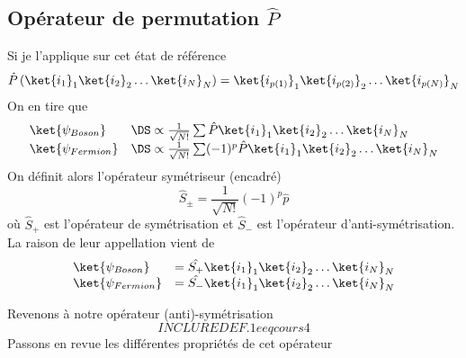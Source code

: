 \subsection{Opérateur de permutation $\hat P$}
Si je l'applique sur cet état de référence
\begin{equation}
\hat{P}\left(\ket{i_1}_1\ket{i_2}_2\dots\ket{i_N}_N\right) = \ket{i_{p(1)}}_1\ket{i_{p(2)}}_2\dots\ket{i_{p(N)}}_N
\end{equation}
On en tire que
\begin{equation}
\begin{array}{ll}
\ket{\psi_{Boson}} &\DS\propto \frac{1}{\sqrt{N!}}\sum \hat{P}\ket{i_1}_1\ket{i_2}_2\dots\ket{i_N}_N\\
\ket{\psi_{Fermion}} &\DS\propto \frac{1}{\sqrt{N!}}\sum(-1)^p \hat{P}\ket{i_1}_1\ket{i_2}_2\dots\ket{i_N}_N
\end{array}
\end{equation}
On définit alors l'opérateur symétriseur (encadré)
\begin{equation}
\hat{S}_\pm = \frac{1}{\sqrt{N!}}(-1)^p \hat{p}
\end{equation}
où $\hat{S}_+$ est l'opérateur de symétrisation et $\hat{S}_-$ est l'opérateur d'anti-symétrisation. La raison de leur 
appellation vient de
\begin{equation}
\begin{array}{ll}
\ket{\psi_{Boson}} &= \hat{S_+} \ket{i_1}_1\ket{i_2}_2\dots\ket{i_N}_N\\
\ket{\psi_{Fermion}} &= \hat{S_-} \ket{i_1}_1\ket{i_2}_2\dots\ket{i_N}_N
\end{array}
\end{equation}


Revenons à notre opérateur (anti)-symétrisation
\begin{equation}
INCLURE DEF. 1e eq cours 4
\end{equation}
Passons en revue les différentes propriétés de cet opérateur

